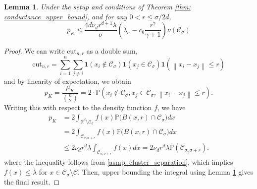 \documentclass{article}
\newcommand{\Reals}{\mathbb{R}}
\newcommand{\Rd}{\Reals^d}
\newcommand{\norm}[1]{\left\lVert#1\right\rVert}
\newcommand{\1}{\mathbf{1}}
\newcommand{\cut}{\mathrm{cut}}
\newcommand{\Pbb}{\mathbb{P}}
\newcommand{\Cset}{\mathcal{C}}
\newcommand{\Csig}{\Cset_{\sigma}}
\newcommand{\Csigr}{\Cset_{\sigma,\sigma + r}}
\theoremstyle{aldenthm}
\newtheorem{lemma}{Lemma}
\begin{document}
\begin{lemma}
	\label{lem: expected_density_cut}
	Under the setup and conditions of Theorem \ref{thm: conductance_upper_bound}, and for any $0 < r \leq \sigma/2d$,
	\begin{equation*}
	p_K \leq \frac{4 d \nu_d r^{d+1} \lambda}{\sigma} \left(\lambda_{\sigma} - c_0\frac{r^{\gamma}}{\gamma + 1}\right) \nu(\Csig)
	\end{equation*}
\end{lemma}
\begin{proof}
	We can write $\cut_{n,r}$ as a double sum,
	\begin{equation}
	\label{eqn: density_cut_expansion}
	\cut_{n,r} = \sum_{i = 1}^{n} \sum_{j \neq i} \1(x_i \not\in \Csig) \1(x_j \in \Csig) \1(\norm{x_i - x_j} \leq r)
	\end{equation}
	and by linearity of expectation, we obtain
	\begin{equation*}
	p_K = \frac{\mu_K}{{n \choose 2}} = 2 \cdot \Pbb(x_i \not\in \Csig, x_j \in \Csig, \norm{x_i - x_j} \leq r). \tag{for each $i,j$, $i \neq j$}
	\end{equation*}
	Writing this with respect to the density function $f$, we have
	\begin{align*}
	p_K & = 2 \int_{\Rd \setminus \Csig} f(x) \Pbb\bigl(B(x,r) \cap \Csig\bigr) dx \\
	& = 2 \int_{\Csigr} f(x) \Pbb\bigl(B(x,r) \cap \Csig\bigr) dx \\
	& \leq 2 \nu_d r^d \lambda  \int_{\Csigr} f(x) dx = 2 \nu_d r^d \lambda \Pbb(\Csigr).
	\end{align*}
	where the inequality follows from \ref{asmp: cluster_separation}, which implies $f(x) \leq \lambda$ for $x \in \Csig \setminus \Cset$. Then, upper bounding the integral using Lemma \ref{lem: expected_density_cut} gives the final result.
\end{proof}
\end{document}
